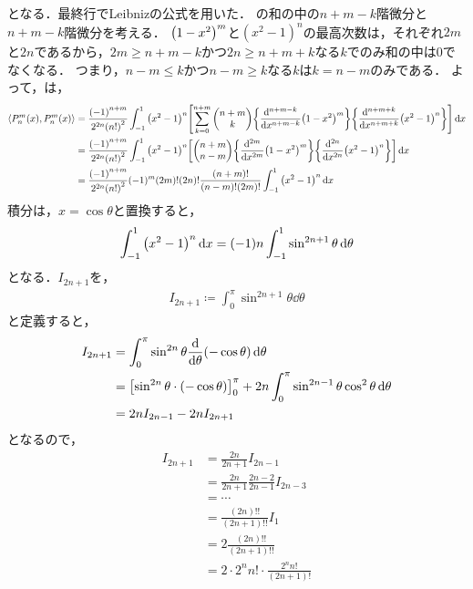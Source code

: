 \documentclass{report}
\begin{document}
    となる．最終行でLeibnizの公式を用いた．
    の和の中の$n + m - k$階微分と$n + m - k$階微分を考える．
    $\qty(1 - x^2)^m$と$(x^2 - 1)^n$の最高次数は，それぞれ$2m$と$2n$であるから，$2m \geq n + m - k$かつ$2n \geq n + m + k$なる$k$でのみ和の中は0でなくなる．
    つまり，$n - m\leq k$かつ$n - m \geq k$なる$k$は$k = n - m$のみである．
    よって，は，
    \begin{align}
      \inner{P_{n}^m(x)}{P_{n}^m(x)} &= \frac{\qty(-1)^{n + m}}{2^{2n}\qty(n!)^2}\int_{-1}^{1}\qty(x^2 - 1)^n\qty[\sum_{k = 0}^{n + m}\mqty(n + m \\ k)\qty{\dv[n + m - k]{x}\qty(1 - x^2)^m}\qty{\dv[n + m + k]{x}\qty(x^2 - 1)^n}] \dd{x} \\ 
      &= \frac{\qty(-1)^{n + m}}{2^{2n}\qty(n!)^2}\int_{-1}^{1}\qty(x^2 - 1)^n\qty[\mqty(n + m \\ n - m)\qty{\dv[2m]{x}\qty(1 - x^2)^m}\qty{\dv[2n]{x}\qty(x^2 - 1)^n}] \dd{x} \\ 
      &= \frac{\qty(-1)^{n + m}}{2^{2n}\qty(n!)^2}(-1)^m\qty(2m)!\qty(2n)!\frac{(n + m)!}{(n - m)!(2m)!}\int_{-1}^{1}\qty(x^2 - 1)^n\dd{x} 
    \end{align}
    積分は，$x = \cos\theta$と置換すると，
    \begin{align}
      \int_{-1}^{1}\qty(x^2 - 1)^n\dd{x} = (-1)n\int_{-1}^{1}\sin^{2n + 1}\theta\dd{\theta}
    \end{align}
    となる．$I_{2n + 1}$を，
    \begin{align}
      I_{2n + 1} \coloneqq \int_{0}^{\pi}\sin^{2n + 1}\theta\dd{\theta}
    \end{align}
    と定義すると，
    \begin{align}
      I_{2n + 1} &= \int_{0}^{\pi} \sin^{2n}\theta\dv{\theta}(-\cos\theta)\dd{\theta} \\ 
      &= \qty[\sin^{2n}\theta\cdot(-\cos\theta)]_{0}^{\pi} + 2n\int_{0}^{\pi}\sin^{2n - 1}\theta \cos^2\theta\dd{\theta} \\ 
      &= 2nI_{2n - 1} - 2nI_{2n + 1}
    \end{align}
    となるので，
    \begin{align}
      I_{2n + 1} &= \frac{2n}{2n + 1}I_{2n - 1} \\ 
      &= \frac{2n}{2n + 1}\frac{2n - 2}{2n - 1}I_{2n - 3} \\ 
      &= \cdots \\ 
      &= \frac{(2n)!!}{(2n + 1)!!}I_1 \\ 
      &= 2\frac{(2n)!!}{(2n + 1)!!} \\ 
      &= 2\cdot 2^nn! \cdot \frac{2^nn!}{(2n + 1)!}
    \end{align}
\end{document}
